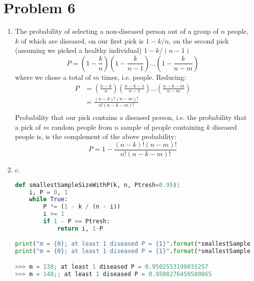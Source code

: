 \documentclass{article}
\newcommand{\1}{\mathbf{1}}
\begin{document}
\section*{Problem 6}
\begin{enumerate}
	\item The probability of selecting a non-diseased person out of a group of $n$ people, $k$ of which are diseased, on our first pick is $1 - k/n$, on the second pick (assuming we picked a healthy individual) $1-k/(n-1)$
	$$P = \left(1 - \frac{k}{n}\right) \left(1 - \frac{k}{n-1}\right) \dots \left(1 - \frac{k}{n-m}\right) $$
	where we chose a total of $m$ times, i.e. people. Reducing:
	\begin{align*}
    P &= \left(\frac{n-k}{n}\right) \left(\frac{n-k-1}{n-1}\right) \dots \left(\frac{n-k-m}{n-m}\right) \\
      &= \frac{(n-k)!(n-m)!}{n!(n-k-m)!} \\
    \end{align*}
    Probability that our pick contains a diseased person, i.e. the probability that a pick of $m$ random people from $n$ sample of people containing $k$ diseased people is, is the complement of the above probability:
    $$P = 1- \frac{(n-k)!(n-m)!}{n!(n-k-m)!}$$
    \item \addtocounter{enumi}{1} c.
        \begin{lstlisting}[language=Python]
def smallestSampleSizeWithP(k, n, Ptresh=0.95):
    i, P = 0, 1
    while True:
        P *= (1 - k / (n - i))
        i += 1
        if 1 - P >= Ptresh:
            return i, 1-P

print("m = {0}; at least 1 diseased P = {1}".format(*smallestSampleSizeWithP(20, 1000)))
print("m = {0}; at least 1 diseased P = {1}".format(*smallestSampleSizeWithP(200, 10000)))

>>> m = 138; at least 1 diseased P = 0.9502553198035257
>>> m = 148;; at least 1 diseased P = 0.9508276450580865
        \end{lstlisting}
    

\end{enumerate}
\end{document}

